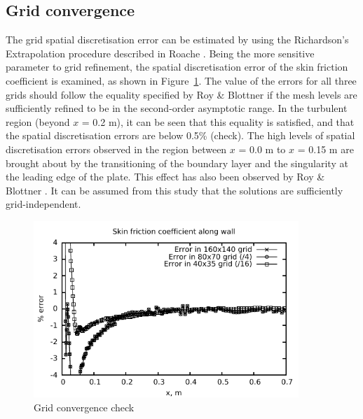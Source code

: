 \subsection{Grid convergence}
%
The grid spatial discretisation error can be estimated by using the
Richardson's Extrapolation procedure described in Roache \cite{Roache1998}. Being
the more sensitive parameter to grid refinement, the spatial discretisation
error of the skin friction coefficient is examined, as shown in
Figure~\ref{spatial-discretisation-error}. The value of the errors for all
three grids should follow the equality specified by Roy \& Blottner \cite{Roy2003} if
the mesh levels are sufficiently refined to be in the second-order asymptotic
range. In the turbulent region (beyond $x$ = 0.2 m), it can be seen that this equality
is satisfied, and that the spatial discretisation errors are below 0.5\% (check).
The high levels of spatial discretisation errors observed in the region between
$x$ = 0.0 m to $x$ = 0.15 m are brought about by the transitioning of the boundary layer
and the singularity at the leading edge of the plate. This effect has also been
observed by Roy \& Blottner \cite{Roy2003}. It can be assumed from this study that the solutions
are sufficiently grid-independent.
\begin{figure}[h]
 \begin{center} \vspace{1cm}
  \includegraphics[width=10cm]{./chap2-flat-plate/figs/coles-x05-cf-error.pdf}
 \end{center}
 \caption{Grid convergence check}
 \label{spatial-discretisation-error}
\end{figure}
